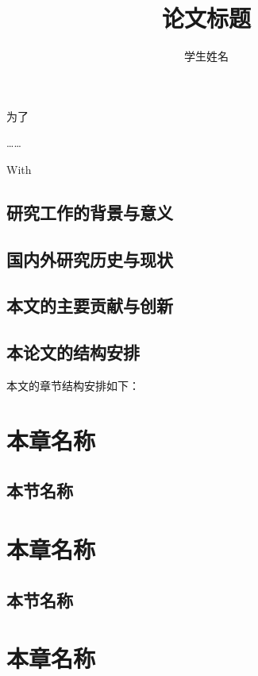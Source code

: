 \documentclass[master]{thesis-swufe}
\title{论文标题}
\author{学生姓名}
\begin{document}
\makecover

\begin{chineseabstract}
为了

……

\end{chineseabstract}

\begin{englishabstract}
With 

\end{englishabstract}

\thesistableofcontents

\thesischapterexordium

\section{研究工作的背景与意义}


\section{国内外研究历史与现状}


\section{本文的主要贡献与创新}


\section{本论文的结构安排}
本文的章节结构安排如下：

\chapter{本章名称}


\section{本节名称}

\chapter{本章名称}


\section{本节名称}

\chapter{本章名称}
\end{document}
